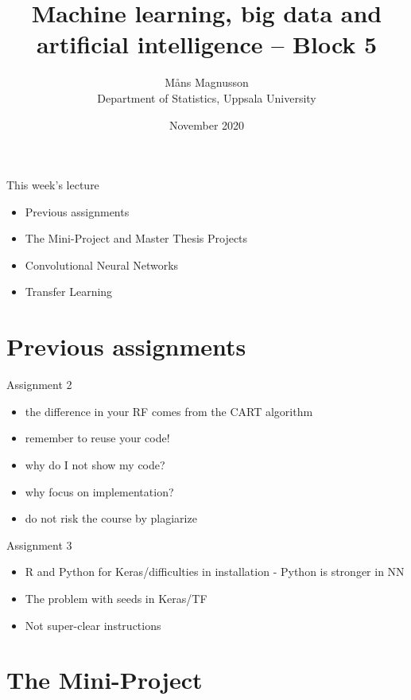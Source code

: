 \documentclass[10pt]{beamer}
\title[]{{\color{black}Machine learning, big data and artificial intelligence -- Block 5}}
\author[]{M{\aa}ns Magnusson\\Department of Statistics, Uppsala University}
\date{November 2020}
\begin{document}
\frame{\titlepage
}



\begin{frame}{This week's lecture}
\begin{itemize}
\item Previous assignments
\item The Mini-Project and Master Thesis Projects
\item Convolutional Neural Networks
\item Transfer Learning
\end{itemize}
\end{frame}




\section{Previous assignments}

\begin{frame}{Assignment 2}

\begin{itemize}
\item the difference in your RF comes from the CART algorithm
\item remember to reuse your code!
\item why do I not show my code?
\item why focus on implementation?
\item do not risk the course by plagiarize
\end{itemize}

\end{frame}

\begin{frame}{Assignment 3}

\begin{itemize}
\item R and Python for Keras/difficulties in installation - Python is stronger in NN
\item The problem with seeds in Keras/TF
\item Not super-clear instructions
\end{itemize}

\end{frame}


\section{The Mini-Project}
\end{document}
